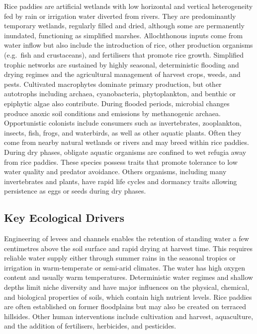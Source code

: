 \documentclass[
  letterpaper,
  DIV=11,
  numbers=noendperiod]{scrartcl}
\begin{document}
Rice paddies are artificial wetlands with low horizontal and vertical
heterogeneity fed by rain or irrigation water diverted from rivers. They
are predominantly temporary wetlands, regularly filled and dried,
although some are permanently inundated, functioning as simplified
marshes. Allochthonous inputs come from water inflow but also include
the introduction of rice, other production organisms (e.g.~fish and
crustaceans), and fertilisers that promote rice growth. Simplified
trophic networks are sustained by highly seasonal, deterministic
flooding and drying regimes and the agricultural management of harvest
crops, weeds, and pests. Cultivated macrophytes dominate primary
production, but other autotrophs including archaea, cyanobacteria,
phytoplankton, and benthic or epiphytic algae also contribute. During
flooded periods, microbial changes produce anoxic soil conditions and
emissions by methanogenic archaea. Opportunistic colonists include
consumers such as invertebrates, zooplankton, insects, fish, frogs, and
waterbirds, as well as other aquatic plants. Often they come from nearby
natural wetlands or rivers and may breed within rice paddies. During dry
phases, obligate aquatic organisms are confined to wet refugia away from
rice paddies. These species possess traits that promote tolerance to low
water quality and predator avoidance. Others organisms, including many
invertebrates and plants, have rapid life cycles and dormancy traits
allowing persistence as eggs or seeds during dry phases.

\subsection{Key Ecological Drivers}\label{key-ecological-drivers-128}

Engineering of levees and channels enables the retention of standing
water a few centimetres above the soil surface and rapid drying at
harvest time. This requires reliable water supply either through summer
rains in the seasonal tropics or irrigation in warm-temperate or
semi-arid climates. The water has high oxygen content and usually warm
temperatures. Deterministic water regimes and shallow depths limit niche
diversity and have major influences on the physical, chemical, and
biological properties of soils, which contain high nutrient levels. Rice
paddies are often established on former floodplains but may also be
created on terraced hillsides. Other human interventions include
cultivation and harvest, aquaculture, and the addition of fertilisers,
herbicides, and pesticides.
\end{document}
